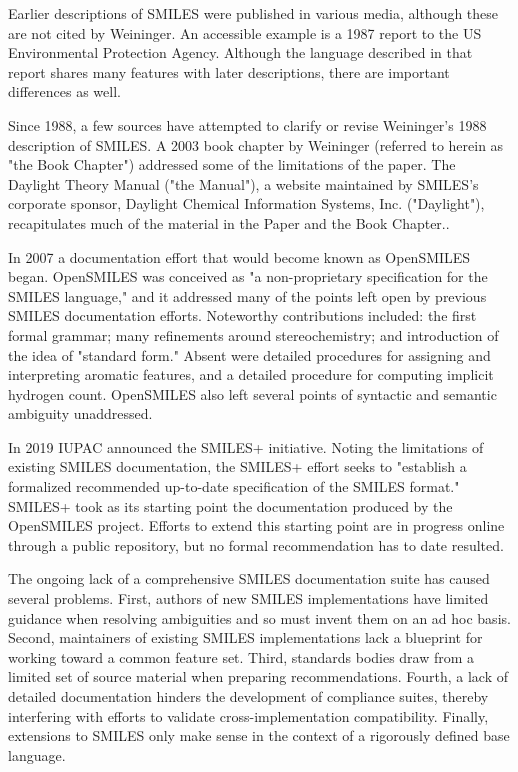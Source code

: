 \documentclass{article}
\begin{document}
Earlier descriptions of SMILES were published in various media, although these are not cited by Weininger. An accessible example is a 1987 report to the US Environmental Protection Agency.\cite{anderson:1987} Although the language described in that report shares many features with later descriptions, there are important differences as well.

Since 1988, a few sources have attempted to clarify or revise Weininger's 1988 description of SMILES. A 2003 book chapter by Weininger (referred to herein as "the Book Chapter") addressed some of the limitations of the paper. The Daylight Theory Manual ("the Manual"), a website maintained by SMILES's corporate sponsor, Daylight Chemical Information Systems, Inc. ("Daylight"), recapitulates much of the material in the Paper and the Book Chapter.\cite{daylightTheory}.

In 2007 a documentation effort that would become known as OpenSMILES began.\cite{openSMILES} OpenSMILES was conceived as "a non-proprietary specification for the SMILES language," and it addressed many of the points left open by previous SMILES documentation efforts. Noteworthy contributions included: the first formal grammar; many refinements around stereochemistry; and introduction of the idea of "standard form." Absent were detailed procedures for assigning and interpreting aromatic features, and a detailed procedure for computing implicit hydrogen count. OpenSMILES also left several points of syntactic and semantic ambiguity unaddressed.

In 2019 IUPAC announced the SMILES+ initiative.\cite{smilesPlusSpecification} Noting the limitations of existing SMILES documentation, the SMILES+ effort seeks to "establish a formalized recommended up-to-date specification of the SMILES format." SMILES+ took as its starting point the documentation produced by the OpenSMILES project. Efforts to extend this starting point are in progress online through a public repository, but no formal recommendation has to date resulted.\cite{smilesPlusGitHub}

The ongoing lack of a comprehensive SMILES documentation suite has caused several problems. First, authors of new SMILES implementations have limited guidance when resolving ambiguities and so must invent them on an ad hoc basis. Second, maintainers of existing SMILES implementations lack a blueprint for working toward a common feature set. Third, standards bodies draw from a limited set of source material when preparing recommendations. Fourth, a lack of detailed documentation hinders the development of compliance suites, thereby interfering with efforts to validate cross-implementation compatibility. Finally, extensions to SMILES only make sense in the context of a rigorously defined base language.
\end{document}
